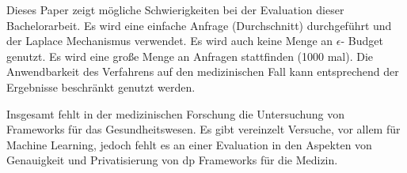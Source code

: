 Dieses Paper zeigt mögliche Schwierigkeiten bei der Evaluation dieser Bachelorarbeit. Es wird eine einfache Anfrage (Durchschnitt) durchgeführt und der Laplace Mechanismus verwendet. Es wird auch keine Menge an $\epsilon$- Budget genutzt. Es wird eine große Menge an Anfragen stattfinden (1000 mal). Die Anwendbarkeit des Verfahrens auf den medizinischen Fall kann entsprechend der Ergebnisse beschränkt genutzt werden.

Insgesamt fehlt in der medizinischen Forschung die Untersuchung von Frameworks für das Gesundheitswesen. Es gibt vereinzelt Versuche, vor allem für Machine Learning, jedoch fehlt es an einer Evaluation in den Aspekten von Genauigkeit und Privatisierung von \gls{dp} Frameworks für die Medizin.


